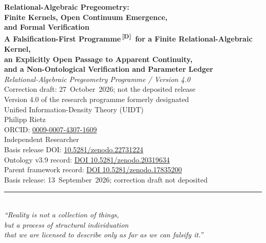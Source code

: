\documentclass[12pt,a4paper,twoside]{article}
\theoremstyle{plain}
\theoremstyle{definition}
\theoremstyle{remark}
\newcommand{\catmark}[1]{\textsuperscript{\textsf{\textbf{[#1]}}}}
\begin{document}
\pagestyle{uidtontology}

\begin{titlepage}
\vspace*{1.6cm}
\begin{center}
{\LARGE\bfseries Relational-Algebraic Pregeometry:\\[0.25em]
Finite Kernels, Open Continuum Emergence,\\[0.25em]
and Formal Verification}\\[0.9em]
{\small\bfseries A Falsification-First Programme\,\catmark{D}\ for a Finite Relational-Algebraic Kernel,\\[0.25em]
an Explicitly Open Passage to Apparent Continuity,\\[0.25em]
and a Non-Ontological Verification and Parameter Ledger}\\[1.5em]
{\large\itshape Relational-Algebraic Pregeometry Programme / Version 4.0}\\[0.25em]
{\small Correction draft: 27~October~2026; not the deposited release}\\[0.5em]
{\small Version 4.0 of the research programme formerly designated\\
Unified Information-Density Theory (UIDT)}\\[2.6em]
{\small Philipp Rietz}\\[0.5em]
{\small ORCID: \href{https://orcid.org/0009-0007-4307-1609}{0009-0007-4307-1609}}\\[0.2em]
{\small Independent Researcher}\\[3em]
{\normalsize Basis release DOI: \href{https://doi.org/10.5281/zenodo.22731224}{10.5281/zenodo.22731224}}\\[0.5em]
{\small Ontology v3.9 record:
\href{https://doi.org/10.5281/zenodo.20319634}{DOI 10.5281/zenodo.20319634}}\\[0.25em]
{\small Parent framework record:
\href{https://doi.org/10.5281/zenodo.17835200}{DOI 10.5281/zenodo.17835200}}\\[0.5em]
{\small Basis release: 13~September~2026; correction draft not deposited}\\[2.2em]
\rule{0.6\textwidth}{0.4pt}\\[1em]
{\small\itshape ``Reality is not a collection of things,\\
but a process of structural individuation\\
that we are licensed to describe only as far as we can falsify it.''}\\[1.4em]
\end{center}
\end{titlepage}
\end{document}

